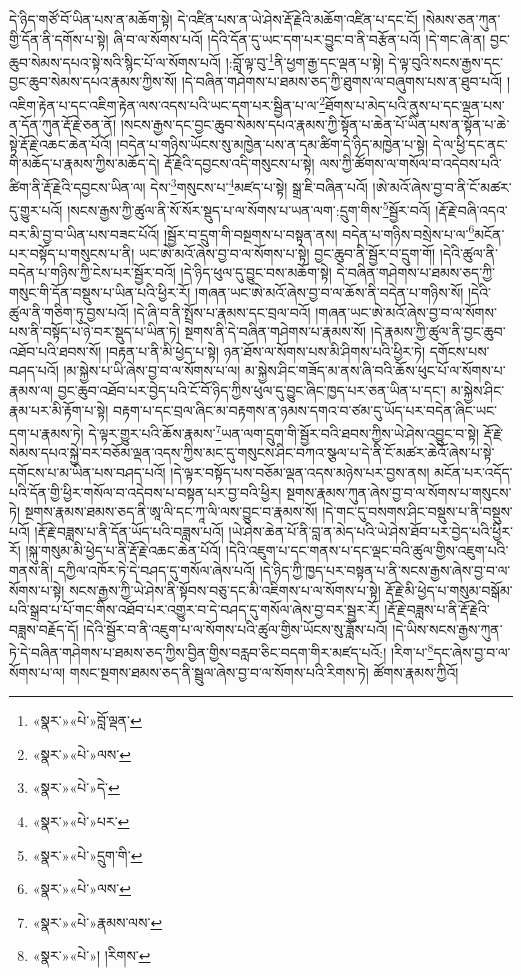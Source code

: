 དེ་ཉིད་གཙོ་བོ་ཡིན་པས་ན་མཆོག་སྟེ། དེ་འཛིན་པས་ན་ཡེ་ཤེས་རྡོ་རྗེའི་མཆོག་འཛིན་པ་དང་ངོ། །སེམས་ཅན་ཀུན་གྱི་དོན་ནི་དགོས་པ་སྟེ། ཞི་བ་ལ་སོགས་པའོ། །དེའི་དོན་དུ་ཡང་དག་པར་བྱུང་བ་ནི་བརྩོན་པའོ། །དེ་གང་ཞེ་ན། བྱང་ཆུབ་སེམས་དཔའ་སྟེ་སའི་སྙིང་པོ་ལ་སོགས་པའོ། །:བློ་ལྟ་བུ་\footnote{«སྣར་»«པེ་»བློ་ལྡན་}ནི་ཕྱག་རྒྱ་དང་ལྡན་པ་སྟེ། དེ་ལྟ་བུའི་སངས་རྒྱས་དང་བྱང་ཆུབ་སེམས་དཔའ་རྣམས་ཀྱིས་སོ། །དེ་བཞིན་གཤེགས་པ་ཐམས་ཅད་ཀྱི་ཐུགས་ལ་བཞུགས་པས་ན་ཐུབ་པའོ། །འཇིག་རྟེན་པ་དང་འཇིག་རྟེན་ལས་འདས་པའི་ཡང་དག་པར་སྦྱིན་པ་ལ་\footnote{«སྣར་»«པེ་»ལས་}ཐོགས་པ་མེད་པའི་ནུས་པ་དང་ལྡན་པས་ན་དོན་ཀུན་རྡོ་རྗེ་ཅན་ནོ། །སངས་རྒྱས་དང་བྱང་ཆུབ་སེམས་དཔའ་རྣམས་ཀྱི་སྟོན་པ་ཆེན་པོ་ཡིན་པས་ན་སྟོན་པ་ཆེ་སྟེ་རྡོ་རྗེ་འཆང་ཆེན་པོའོ། །བདེན་པ་གཉིས་ཡོངས་སུ་མཁྱེན་པས་ན་དམ་ཚིག་དེ་ཉིད་མཁྱེན་པ་སྟེ། དེ་ལ་ཕྱི་དང་ནང་གི་མཆོད་པ་རྣམས་ཀྱིས་མཆོད་དེ། རྡོ་རྗེའི་དབྱངས་འདི་གསུངས་པ་སྟེ། ལས་ཀྱི་ཚོགས་ལ་གསོལ་བ་འདེབས་པའི་ཚིག་ནི་རྡོ་རྗེའི་དབྱངས་ཡིན་ལ། དེས་\footnote{«སྣར་»«པེ་»དེ་}གསུངས་པ་\footnote{«སྣར་»«པེ་»པར་}མཛད་པ་སྟེ། སྒྲ་ཇི་བཞིན་པའོ། །ཨེ་མའོ་ཞེས་བྱ་བ་ནི་ངོ་མཚར་དུ་གྱུར་པའོ། །སངས་རྒྱས་ཀྱི་ཚུལ་ནི་སོ་སོར་སྡུད་པ་ལ་སོགས་པ་ཡན་ལག་:དྲུག་གིས་\footnote{«སྣར་»«པེ་»དྲུག་གི་}སྦྱོར་བའོ། །རྡོ་རྗེ་བཞི་འདའ་བར་མི་བྱ་བ་ཡིན་པས་བཟང་པོའོ། །སྦྱོར་བ་དྲུག་གི་བསྔགས་པ་བསྟན་ནས། བདེན་པ་གཉིས་བསྲེས་པ་ལ་\footnote{«སྣར་»«པེ་»ལས་}མངོན་པར་བསྟོད་པ་གསུངས་པ་ནི། ཡང་ཨེ་མའོ་ཞེས་བྱ་བ་ལ་སོགས་པ་སྟེ། བྱང་ཆུབ་ནི་སྦྱོར་བ་དྲུག་གོ། །དེའི་ཚུལ་ནི་བདེན་པ་གཉིས་ཀྱི་ངེས་པར་སྦྱོར་བའོ། །དེ་ཉིད་ཕུལ་དུ་བྱུང་བས་མཆོག་སྟེ། དེ་བཞིན་གཤེགས་པ་ཐམས་ཅད་ཀྱི་གསུང་གི་དོན་བསྡུས་པ་ཡིན་པའི་ཕྱིར་རོ། །གཞན་ཡང་ཨེ་མའོ་ཞེས་བྱ་བ་ལ་ཆོས་ནི་བདེན་པ་གཉིས་སོ། །དེའི་ཚུལ་ནི་གཅིག་ཏུ་བྱས་པའོ། །དེ་ཞི་བ་ནི་སྤྲོས་པ་རྣམས་དང་བྲལ་བའོ། །གཞན་ཡང་ཨེ་མའོ་ཞེས་བྱ་བ་ལ་སོགས་པས་ནི་བསྟོད་པ་ཉེ་བར་སྡུད་པ་ཡིན་ཏེ། སྔགས་ནི་དེ་བཞིན་གཤེགས་པ་རྣམས་སོ། །དེ་རྣམས་ཀྱི་ཚུལ་ནི་བྱང་ཆུབ་འཐོབ་པའི་ཐབས་སོ། །བརྟན་པ་ནི་མི་ཕྱེད་པ་སྟེ། ཉན་ཐོས་ལ་སོགས་པས་མི་ཤིགས་པའི་ཕྱིར་ཏེ། དགོངས་པས་བཤད་པའོ། །མ་སྐྱེས་པ་ཡི་ཞེས་བྱ་བ་ལ་སོགས་པ་ལ། མ་སྐྱེས་ཤིང་གཟོད་མ་ནས་ཞི་བའི་ཆོས་ཕུང་པོ་ལ་སོགས་པ་རྣམས་ལ། བྱང་ཆུབ་འཐོབ་པར་བྱེད་པའི་ངོ་བོ་ཉིད་ཀྱིས་ཕུལ་དུ་བྱུང་ཞིང་ཁྱད་པར་ཅན་ཡིན་པ་དང་། མ་སྐྱེས་ཤིང་རྣམ་པར་མི་རྟོག་པ་སྟེ། བརྟག་པ་དང་བྲལ་ཞིང་མ་བརྟགས་ན་ཉམས་དགའ་བ་ཙམ་དུ་ཡོད་པར་བདེན་ཞིང་ཡང་དག་པ་རྣམས་ཏེ། དེ་ལྟར་གྱུར་པའི་ཆོས་རྣམས་\footnote{«སྣར་»«པེ་»རྣམས་ལས་}ཡན་ལག་དྲུག་གི་སྦྱོར་བའི་ཐབས་ཀྱིས་ཡེ་ཤེས་འབྱུང་བ་སྟེ། རྡོ་རྗེ་སེམས་དཔའ་སྐྱེ་བར་བཅོམ་ལྡན་འདས་ཀྱིས་མང་དུ་གསུངས་ཤིང་བཀའ་སྩལ་པ་དེ་ནི་ངོ་མཚར་ཆེའོ་ཞེས་པ་སྟེ་དགོངས་པ་མ་ཡིན་པས་བཤད་པའོ། །དེ་ལྟར་བསྟོད་པས་བཅོམ་ལྡན་འདས་མཉེས་པར་བྱས་ནས། མངོན་པར་འདོད་པའི་དོན་གྱི་ཕྱིར་གསོལ་བ་འདེབས་པ་བསྟན་པར་བྱ་བའི་ཕྱིར། སྔགས་རྣམས་ཀུན་ཞེས་བྱ་བ་ལ་སོགས་པ་གསུངས་ཏེ། སྔགས་རྣམས་ཐམས་ཅད་ནི་ཨཱ་ལི་དང་ཀཱ་ལི་ལས་བྱུང་བ་རྣམས་སོ། །དེ་གང་དུ་བསགས་ཤིང་བསྡུས་པ་ནི་བསྡུས་པའོ། །རྡོ་རྗེ་བཟླས་པ་ནི་དོན་ཡོད་པའི་བཟླས་པའོ། །ཡེ་ཤེས་ཆེན་པོ་ནི་བླ་ན་མེད་པའི་ཡེ་ཤེས་ཐོབ་པར་བྱེད་པའི་ཕྱིར་རོ། །སྐུ་གསུམ་མི་ཕྱེད་པ་ནི་རྡོ་རྗེ་འཆང་ཆེན་པོའོ། །དེའི་འཇུག་པ་དང་གནས་པ་དང་ལྡང་བའི་ཚུལ་གྱིས་འཇུག་པའི་གནས་ནི། དཀྱིལ་འཁོར་ཏེ་དེ་བཤད་དུ་གསོལ་ཞེས་པའོ། །དེ་ཉིད་ཀྱི་ཁྱད་པར་བསྟན་པ་ནི་སངས་རྒྱས་ཞེས་བྱ་བ་ལ་སོགས་པ་སྟེ། སངས་རྒྱས་ཀྱི་ཡེ་ཤེས་ནི་སྟོབས་བཅུ་དང་མི་འཇིགས་པ་ལ་སོགས་པ་སྟེ། རྡོ་རྗེ་མི་ཕྱེད་པ་གསུམ་བསྒོམ་པའི་སྒྲབ་པ་པོ་གང་གིས་འཐོབ་པར་འགྱུར་བ་དེ་བཤད་དུ་གསོལ་ཞེས་བྱ་བར་སྦྱར་རོ། །རྡོ་རྗེ་བཟླས་པ་ནི་རྡོ་རྗེའི་བཟླས་བརྗོད་དོ། །དེའི་སྦྱོར་བ་ནི་འཇུག་པ་ལ་སོགས་པའི་ཚུལ་གྱིས་ཡོངས་སུ་ཟློས་པའོ། །དེ་ཡིས་སངས་རྒྱས་ཀུན་ཏེ་དེ་བཞིན་གཤེགས་པ་ཐམས་ཅད་ཀྱིས་བྱིན་གྱིས་བརླབ་ཅིང་བདག་གིར་མཛད་པའོ:། །རིག་པ་\footnote{«སྣར་»«པེ་»། །རིགས་}དང་ཞེས་བྱ་བ་ལ་སོགས་པ་ལ། གསང་སྔགས་ཐམས་ཅད་ནི་སྦྲུལ་ཞེས་བྱ་བ་ལ་སོགས་པའི་རིགས་ཏེ། ཚོགས་རྣམས་ཀྱིའོ། 